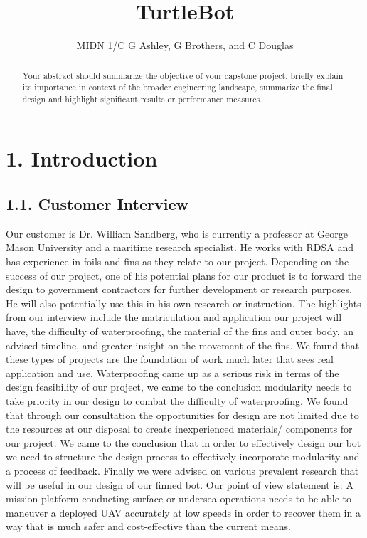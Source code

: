 \documentclass[10pt]{article}
\title{TurtleBot}
\author{MIDN 1/C G Ashley, G Brothers, and C Douglas}
\date{\printdate{12/3/2020}}
\begin{document}
\maketitlepage
\cleardoublepage
\tableofcontents

\clearpage
\maketitle
\begin{abstract}
Your abstract should summarize the objective of your capstone project, briefly explain its importance in context of the broader engineering landscape, summarize the final design and highlight significant results or performance measures.
\end{abstract}

\section{1. Introduction}
\subsection{1.1. Customer Interview}
Our customer is Dr. William Sandberg, who is currently a professor at George Mason University and a maritime research specialist. He works with RDSA and has experience in foils and fins as they relate to our project. Depending on the success of our project, one of his potential plans for our product is to forward the design to government contractors for further development or research purposes. He will also potentially use this in his own research or instruction. The highlights from our interview include the matriculation and application our project will have, the difficulty of waterproofing, the material of the fins and outer body, an advised timeline, and greater insight on the movement of the fins. We found that these types of projects are the foundation of work much later that sees real application and use. Waterproofing came up as a serious risk in terms of the design feasibility of our project, we came to the conclusion modularity needs to take priority in our design to combat the difficulty of waterproofing. We found that through our consultation the opportunities for design are not limited due to the resources at our disposal to create inexperienced materials/ components for our project. We came to the conclusion that in order to effectively design our bot we need to structure the design process to effectively incorporate modularity and a process of feedback. Finally we were advised on various prevalent research that will be useful in our design of our finned bot. Our point of view statement is: A mission platform conducting surface or undersea operations needs to be able to maneuver a deployed UAV accurately at low speeds in order to recover them in a way that is much safer and cost-effective than the current means. 
\end{document}
